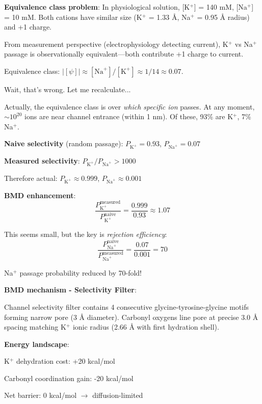 \documentclass[11pt,onecolumn]{article}
\begin{document}
\textbf{Equivalence class problem}: In physiological solution, [K$^+$] = 140 mM, [Na$^+$] = 10 mM. Both cations have similar size (K$^+$ = 1.33 Å, Na$^+$ = 0.95 Å radius) and +1 charge.

From measurement perspective (electrophysiology detecting current), K$^+$ vs Na$^+$ passage is observationally equivalent---both contribute +1 charge to current.

Equivalence class: $|[\psi]| \approx [\text{Na}^+]/[\text{K}^+] \approx 1/14 \approx 0.07$.

Wait, that's wrong. Let me recalculate...

Actually, the equivalence class is over \textit{which specific ion} passes. At any moment, $\sim 10^{20}$ ions are near channel entrance (within 1 nm). Of these, 93\% are K$^+$, 7\% Na$^+$. 

\textbf{Naive selectivity} (random passage): $P_{\text{K}^+} = 0.93$, $P_{\text{Na}^+} = 0.07$

\textbf{Measured selectivity}: $P_{\text{K}^+}/P_{\text{Na}^+} > 1000$

Therefore actual: $P_{\text{K}^+} \approx 0.999$, $P_{\text{Na}^+} \approx 0.001$

\textbf{BMD enhancement}:
\begin{equation}
\frac{P_{\text{K}^+}^{\text{measured}}}{P_{\text{K}^+}^{\text{naive}}} = \frac{0.999}{0.93} \approx 1.07
\end{equation}

This seems small, but the key is \textit{rejection efficiency}:
\begin{equation}
\frac{P_{\text{Na}^+}^{\text{naive}}}{P_{\text{Na}^+}^{\text{measured}}} = \frac{0.07}{0.001} = 70
\end{equation}

Na$^+$ passage probability reduced by 70-fold!

\textbf{BMD mechanism - Selectivity Filter}:

Channel selectivity filter contains 4 consecutive glycine-tyrosine-glycine motifs forming narrow pore (3 Å diameter). Carbonyl oxygens line pore at precise 3.0 Å spacing matching K$^+$ ionic radius (2.66 Å with first hydration shell).

\textbf{Energy landscape}:

K$^+$ dehydration cost: +20 kcal/mol

Carbonyl coordination gain: -20 kcal/mol

Net barrier: 0 kcal/mol $\to$ diffusion-limited
\end{document}
